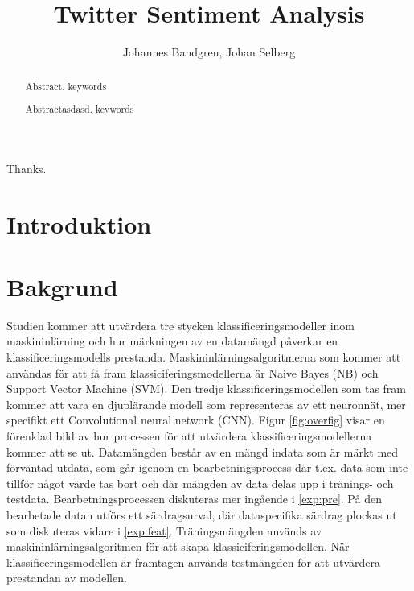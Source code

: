 \documentclass{kaumasters} %
\title{Twitter Sentiment Analysis}
\author{Johannes Bandgren, Johan Selberg}
\institute{Department of Computer Science}
\begin{document}



\maketitle

\frontmatter
\approvalpage%

\begin{abstract}
  Abstract.
  \keywords keywords
\end{abstract}

\begin{abstract}
  Abstractasdasd.
  \keywords keywords
\end{abstract}




\begin{acknowledgements}
  Thanks.
\end{acknowledgements}

\tableofcontents{}
\listoffigures
\listoftables
\lstlistoflistings

\mainmatter
\pagestyle{fancy}
\fancyhead[LE,RO]{\thepage}
\fancyhead[RE,LO]{\rightmark}
\fancyfoot{}
\chapter{Introduktion}

\newpage


\chapter{Bakgrund}\label{bak}
Studien kommer att utvärdera tre stycken klassificeringsmodeller inom maskininlärning och hur märkningen av en datamängd påverkar en klassificeringsmodells prestanda. Maskininlärningsalgoritmerna som kommer att användas för att få fram klassiciferingsmodellerna är Naive Bayes (NB) och Support Vector Machine  (SVM). Den tredje klassificeringsmodellen som tas fram kommer att vara en djuplärande modell  som representeras av ett neuronnät, mer specifikt ett Convolutional neural network (CNN). Figur \ref{fig:overfig} visar en förenklad bild av hur processen för att utvärdera klassificeringsmodellerna kommer att se ut. Datamängden består av en mängd indata som är märkt med förväntad utdata, som går igenom en bearbetningsprocess där t.ex. data som inte tillför något värde tas bort och där mängden av data delas upp i tränings- och testdata.  Bearbetningsprocessen diskuteras mer ingående i \ref{exp:pre}. På den bearbetade datan utförs ett särdragsurval, där dataspecifika särdrag plockas ut som diskuteras vidare i \ref{exp:feat}. Träningsmängden används av maskininlärningsalgoritmen för att skapa klassiciferingsmodellen. När klassificeringsmodellen är framtagen används testmängden för att utvärdera prestandan av modellen.
\end{document}

